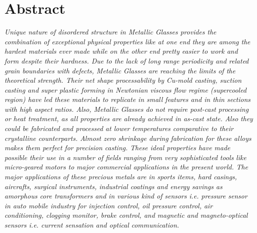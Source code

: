 %
\chapter*{Abstract}
\label{sec:abstract}
\vspace*{10mm}


\textit{\large
Unique nature of disordered structure in Metallic Glasses provides the combination of exceptional physical properties like at one end they are among the hardest materials ever made while on the other end pretty easier to work and form despite their hardness. Due to the lack of long range periodicity and related grain boundaries with defects, Metallic Glasses are reaching the limits of the theoretical strength. Their net shape processability by Cu-mold casting, suction casting and super plastic forming in Newtonian viscous flow regime (supercooled region) have led these materials to replicate in small features and in thin sections with high aspect ratios. Also, Metallic Glasses do not require post-cast processing or heat treatment, as all properties are already achieved in as-cast state. Also they could be fabricated and processed at lower temperatures comparative to their crystalline counterparts. Almost zero shrinkage during fabrication for these alloys makes them perfect for precision casting. These ideal properties have made possible their use in a number of fields ranging from very sophisticated tools like micro-geared motors to major commercial applications in the present world. The major applications of these precious metals are in sports items, hard casings, aircrafts, surgical instruments, industrial coatings and energy savings as amorphous core transformers and in various kind of sensors i.e. pressure sensor in auto mobile industry for injection control, oil pressure control, air conditioning, clogging monitor, brake control, and magnetic and magneto-optical sensors i.e. current sensation and optical communication.
}
